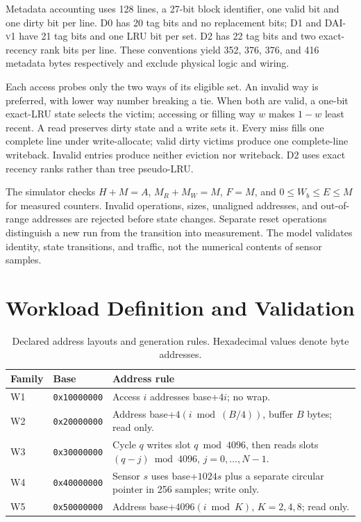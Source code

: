 \documentclass[11pt,a4paper]{article}
\newcommand{\dai}{\textsc{DAI-v1}}
\begin{document}
Metadata accounting uses 128 lines, a 27-bit block identifier, one valid bit and one dirty bit per line. D0 has 20 tag bits and no replacement bits; D1 and \dai{} have 21 tag bits and one LRU bit per set. D2 has 22 tag bits and two exact-recency rank bits per line. These conventions yield 352, 376, 376, and 416 metadata bytes respectively and exclude physical logic and wiring.

Each access probes only the two ways of its eligible set. An invalid way is preferred, with lower way number breaking a tie. When both are valid, a one-bit exact-LRU state selects the victim; accessing or filling way $w$ makes $1-w$ least recent. A read preserves dirty state and a write sets it. Every miss fills one complete line under write-allocate; valid dirty victims produce one complete-line writeback. Invalid entries produce neither eviction nor writeback. D2 uses exact recency ranks rather than tree pseudo-LRU.

The simulator checks $H+M=A$, $M_R+M_W=M$, $F=M$, and $0\le W_b\le E\le M$ for measured counters. Invalid operations, sizes, unaligned addresses, and out-of-range addresses are rejected before state changes. Separate reset operations distinguish a new run from the transition into measurement. The model validates identity, state transitions, and traffic, not the numerical contents of sensor samples.

\section{Workload Definition and Validation}\label{app:workloads}
\begin{table}[htbp]\centering\small
\caption{Declared address layouts and generation rules. Hexadecimal values denote byte addresses.}
\begin{tabularx}{\linewidth}{l l Y}\toprule
Family & Base & Address rule\\\midrule
W1 & \texttt{0x10000000} & Access $i$ addresses base+$4i$; no wrap.\\
W2 & \texttt{0x20000000} & Address base+$4(i\bmod(B/4))$, buffer $B$ bytes; read only.\\
W3 & \texttt{0x30000000} & Cycle $q$ writes slot $q\bmod4096$, then reads slots $(q-j)\bmod4096$, $j=0,\ldots,N-1$.\\
W4 & \texttt{0x40000000} & Sensor $s$ uses base+$1024s$ plus a separate circular pointer in 256 samples; write only.\\
W5 & \texttt{0x50000000} & Address base+$4096(i\bmod K)$, $K=2,4,8$; read only.\\\bottomrule
\end{tabularx}
\end{table}
\end{document}
